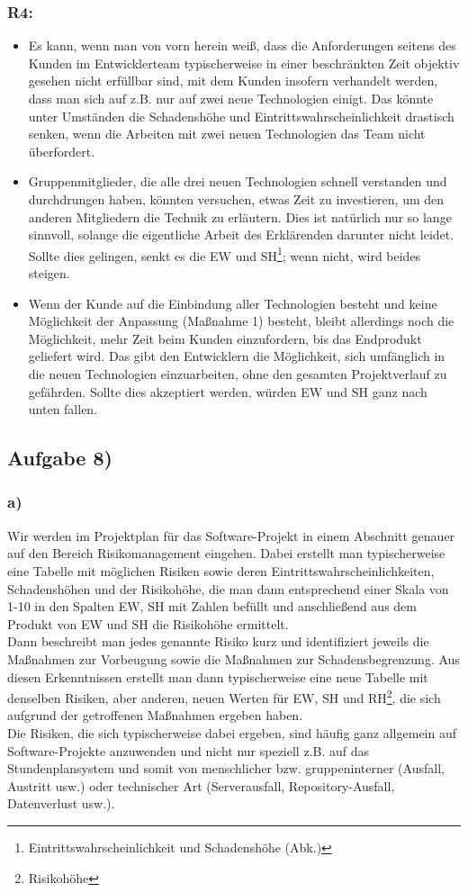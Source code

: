 \documentclass{swp1}
\begin{document}
\subsubsection*{R4:}
\begin{itemize}
\item Es kann, wenn man von vorn herein weiß, dass die Anforderungen seitens des Kunden im Entwicklerteam typischerweise in einer beschränkten Zeit objektiv gesehen nicht erfüllbar sind, mit dem Kunden insofern verhandelt werden, dass man sich auf z.B. nur auf zwei neue Technologien einigt. Das könnte unter Umständen die Schadenshöhe und Eintrittswahrscheinlichkeit drastisch senken, wenn die Arbeiten mit zwei neuen Technologien das Team nicht überfordert.
\item Gruppenmitglieder, die alle drei neuen Technologien schnell verstanden und durchdrungen haben, könnten versuchen, etwas Zeit zu investieren, um den anderen Mitgliedern die Technik zu erläutern. Dies ist natürlich nur so lange sinnvoll, solange die eigentliche Arbeit des Erklärenden darunter nicht leidet. Sollte dies gelingen, senkt es die EW und SH\footnote{Eintrittswahrscheinlichkeit und Schadenshöhe (Abk.)}; wenn nicht, wird beides steigen.
\item Wenn der Kunde auf die Einbindung aller Technologien besteht und keine Möglichkeit der Anpassung (Maßnahme 1) besteht, bleibt allerdings noch die Möglichkeit, mehr Zeit beim Kunden einzufordern, bis das Endprodukt geliefert wird. Das gibt den Entwicklern die Möglichkeit, sich umfänglich in die neuen Technologien einzuarbeiten, ohne den gesamten Projektverlauf zu gefährden. Sollte dies akzeptiert werden, würden EW und SH ganz nach unten fallen.
\end{itemize}

\subsection*{Aufgabe 8)}
\subsubsection*{a)}
Wir werden im Projektplan für das Software-Projekt in einem Abschnitt genauer auf den Bereich Risikomanagement eingehen. Dabei erstellt man typischerweise eine Tabelle mit möglichen Risiken sowie deren Eintrittswahrscheinlichkeiten, Schadenshöhen und der Risikohöhe, die man dann entsprechend einer Skala von 1-10 in den Spalten EW, SH mit Zahlen befüllt und anschließend aus dem Produkt von EW und SH die Risikohöhe ermittelt.\\
Dann beschreibt man jedes genannte Risiko kurz und identifiziert jeweils die Maßnahmen zur Vorbeugung sowie die Maßnahmen zur Schadensbegrenzung.
Aus diesen Erkenntnissen erstellt man dann typischerweise eine neue Tabelle mit denselben Risiken, aber anderen, neuen Werten für EW, SH und RH\footnote{Risikohöhe}, die sich aufgrund der getroffenen Maßnahmen ergeben haben.\\
Die Risiken, die sich typischerweise dabei ergeben, sind häufig ganz allgemein auf Software-Projekte anzuwenden und nicht nur speziell z.B. auf das Stundenplansystem und somit von menschlicher bzw. gruppeninterner (Ausfall, Austritt usw.) oder technischer Art (Serverausfall, Repository-Ausfall, Datenverlust usw.).
\end{document}
